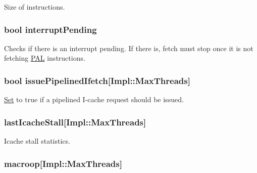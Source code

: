 \label{classDefaultFetch_a494a9a986bc62c946604f9e9047ad237}
Size of instructions. \hypertarget{classDefaultFetch_a310de3efc6b60f47de5792d2b00d0840}{
\subsubsection[{interruptPending}]{\setlength{\rightskip}{0pt plus 5cm}bool {\bf interruptPending}}}
\label{classDefaultFetch_a310de3efc6b60f47de5792d2b00d0840}
Checks if there is an interrupt pending. If there is, fetch must stop once it is not fetching \hyperlink{structPAL}{PAL} instructions. \hypertarget{classDefaultFetch_a4004484fff11512f43124243e7eac71a}{
\subsubsection[{issuePipelinedIfetch}]{\setlength{\rightskip}{0pt plus 5cm}bool {\bf issuePipelinedIfetch}\mbox{[}Impl::MaxThreads\mbox{]}}}
\label{classDefaultFetch_a4004484fff11512f43124243e7eac71a}
\hyperlink{classSet}{Set} to true if a pipelined I-\/cache request should be issued. \hypertarget{classDefaultFetch_a1848d938e5258a2a79298169e43efde5}{
\subsubsection[{lastIcacheStall}]{ {\bf lastIcacheStall}\mbox{[}Impl::MaxThreads\mbox{]}}}
\label{classDefaultFetch_a1848d938e5258a2a79298169e43efde5}
Icache stall statistics. \hypertarget{classDefaultFetch_a1f84ef3ef8e6b11f3bb9a3a0a6224345}{
\subsubsection[{macroop}]{ {\bf macroop}\mbox{[}Impl::MaxThreads\mbox{]}}}
